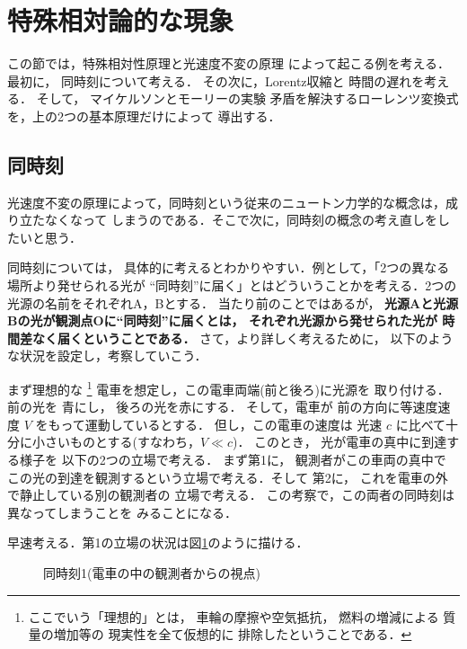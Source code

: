 ﻿\section{特殊相対論的な現象}
\begin{mycomment}
この節では，特殊相対性原理と光速度不変の原理
によって起こる例を考える．最初に，
同時刻について考える．
その次に，Lorentz収縮と
時間の遅れを考える．
そして，
マイケルソンとモーリーの実験
矛盾を解決するローレンツ変換式
を，上の2つの基本原理だけによって
導出する．
\end{mycomment}


\subsection{同時刻}
\begin{mycomment}
光速度不変の原理によって，同時刻という従来のニュートン力学的な概念は，成り立たなくなって
しまうのである．そこで次に，同時刻の概念の考え直しをしたいと思う．
\end{mycomment}


同時刻については，
具体的に考えるとわかりやすい．例として，「2つの異なる場所より発せられる光が
“同時刻”に届く」とはどういうことかを考える．2つの光源の名前をそれぞれA，Bとする．
当たり前のことではあるが，\textbf{
光源Aと光源Bの光が観測点Oに“同時刻”に届くとは，
それぞれ光源から発せられた光が
時間差なく届くということである．}
さて，より詳しく考えるために，
以下のような状況を設定し，考察していこう．

まず理想的な
\footnote{
ここでいう「理想的」とは，
車輪の摩擦や空気抵抗，
燃料の増減による
質量の増加等の
現実性を全て仮想的に
排除したということである．
}
電車を想定し，この電車両端(前と後ろ)に光源を
取り付ける．前の光を
青にし，
後ろの光を赤にする．
そして，電車が
前の方向に等速度速度 $V$ をもって運動しているとする．
但し，この電車の速度は
光速 $c$ に比べて十分に小さいものとする(すなわち，$V\ll c$)．
このとき，
光が電車の真中に到達する様子を
以下の2つの立場で考える．
まず第1に，
観測者がこの車両の真中で
この光の到達を観測するという立場で考える．そして
第2に，
これを電車の外で静止している別の観測者の
立場で考える．
この考察で，この両者の同時刻は異なってしまうことを
みることになる．

早速考える．第1の立場の状況は図\ref{fig:doujikoku1}のように描ける．
                \begin{figure}[hbt]
                    \begin{center}
                        \caption{同時刻1(電車の中の観測者からの視点)}
                        \label{fig:doujikoku1}
                    \end{center}
                \end{figure}

